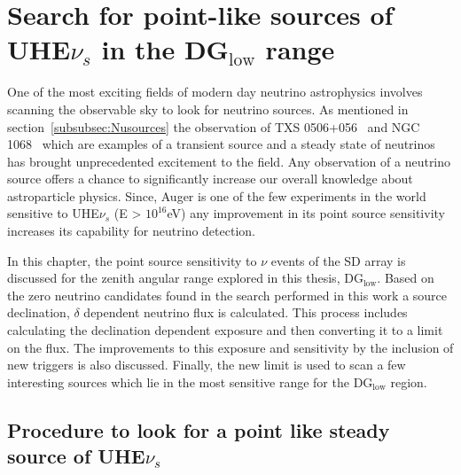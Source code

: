 
\chapter{Search for point-like sources of UHE$\nu_s$ in the DG$_{\text{low}}$ range}
\label{chap:follow-up}

One of the most exciting fields of modern day neutrino astrophysics involves scanning the observable sky to look for neutrino sources. As mentioned in section~\ref{subsubsec:Nusources} the observation of TXS 0506+056~\cite{Icecube_txs} and NGC 1068~\cite{Icecube_2022} which are examples of a transient source and a steady state of neutrinos has brought unprecedented excitement to the field. Any observation of a neutrino source offers a chance to significantly increase our overall knowledge about astroparticle physics. Since, Auger is one of the few experiments in the world sensitive to UHE$\nu_s$ (E > $10^{16}$eV) any improvement in its point source sensitivity increases its capability for neutrino detection. 

In this chapter, the point source sensitivity to $\nu$ events of the SD array is discussed for the zenith angular range explored in this thesis, DG$_{\text{low}}$. Based on the zero neutrino candidates found in the search performed in this work a source declination, $\delta$ dependent neutrino flux is calculated. This process includes calculating the declination dependent exposure and then converting it to a limit on the flux. The improvements to this exposure and sensitivity by the inclusion of new triggers is also discussed. Finally, the new limit is used to scan a few interesting sources which lie in the most sensitive range for the DG$_{\text{low}}$ region.

\section{Procedure to look for a point like steady source of UHE$\nu_s$}
\label{sec:procedure_point_source}

